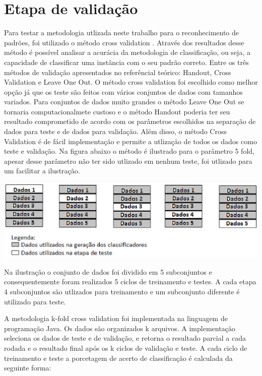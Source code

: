 \section{Etapa de validação}
Para testar a metodologia utlizada neste trabalho para o reconhecimento de padrões, foi utilizado o método cross validation \cite{Kohavi95Cross} \cite{Baldisserotto05Validacao}. Através dos resultados desse método é possível analisar a acurácia da metodologia de classificação, ou seja, a capacidade de classificar uma instância com o seu padrão correto.
Entre os três métodos de validação apresentados no referêncial teórico: Handout, Cross Validation e Leave One Out. O método cross validation foi escolhido como melhor opção já que os teste são feitos com vários conjuntos de dados com tamanhos variados. Para conjuntos de dados muito grandes o método Leave One Out se tornaria computacionalmete custoso e o método Handout poderia ter seu resultado comprometido de acordo com os parâmetros escolhidos na separação de dados para teste e de dados para validação. Além disso, o método Cross Validation é de fácil implementação e permite a utlização de todos os dados como teste e validação.
Na figura abaixo o método é ilustrado para o parâmetro 5 fold, apesar desse parâmetro não ter sido utlizado em nenhum teste, foi utlizado para um facilitar a ilustração. 
\begin{center}
	\includegraphics[scale=1.0]{graficos/cross_validation}
	\label{img:cross_validation}
\end{center}

Na ilustração o conjunto de dados foi dividido em 5 subconjuntos e consequentemente foram realizados 5 ciclos de treinamento e testes. A cada etapa 4 subconjuntos são utlizados para treinamento e um subconjunto diferente é utilizado para teste. 

A metodologia k-fold cross validation foi implementada na linguagem de programação Java. Os dados são organizados k arquivos. A implementação seleciona os dados de teste e de validação, e retorna o resultado parcial a cada rodada e o resultado final após os k ciclos de validação e teste. A cada ciclo de treinamento e teste a porcetagem de acerto de classificação é calculada da seguinte forma:

